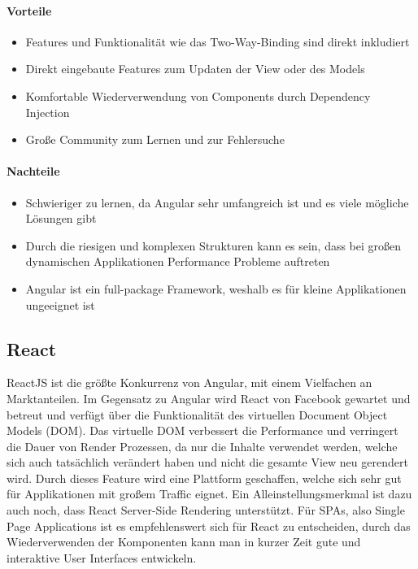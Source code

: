 \paragraph{Vorteile}
\begin{itemize}
    \item Features und Funktionalität wie das Two-Way-Binding sind direkt inkludiert
    \item Direkt eingebaute Features zum Updaten der View oder des Models
    \item Komfortable Wiederverwendung von Components durch Dependency Injection
    \item Große Community zum Lernen und zur Fehlersuche
\end{itemize}

\paragraph{Nachteile}
\begin{itemize}
    \item Schwieriger zu lernen, da Angular sehr umfangreich ist und es viele mögliche Lösungen gibt
    \item Durch die riesigen und komplexen Strukturen kann es sein, dass bei großen dynamischen Applikationen Performance Probleme auftreten
    \item Angular ist ein full-package Framework, weshalb es für kleine Applikationen ungeeignet ist
\end{itemize}

\subsection{React}
\label{subsec:react}
ReactJS ist die größte Konkurrenz von Angular, mit einem Vielfachen an Marktanteilen.
Im Gegensatz zu Angular wird React von Facebook gewartet und betreut und verfügt über die Funktionalität des virtuellen
Document Object Models (DOM).
Das virtuelle DOM verbessert die Performance und verringert die Dauer von Render Prozessen, da nur die Inhalte verwendet werden,
welche sich auch tatsächlich verändert haben und nicht die gesamte View neu gerendert wird.
Durch dieses Feature wird eine Plattform geschaffen, welche sich sehr gut für Applikationen mit großem Traffic eignet.
Ein Alleinstellungsmerkmal ist dazu auch noch, dass React Server-Side Rendering unterstützt.
Für SPAs, also Single Page Applications ist es empfehlenswert sich für React zu entscheiden, durch das Wiederverwenden der
Komponenten kann man in kurzer Zeit gute und interaktive User Interfaces entwickeln.

